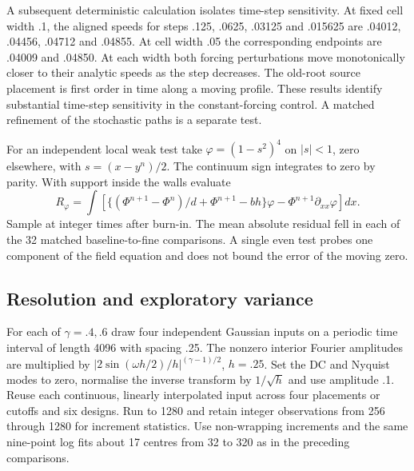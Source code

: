 \documentclass[11pt]{article}
\begin{document}
A subsequent deterministic calculation isolates time-step sensitivity.
At fixed cell width .1, the aligned speeds for steps .125, .0625, .03125
and .015625 are .04012, .04456, .04712 and .04855. At cell width .05 the
corresponding endpoints are .04009 and .04850. At each width both forcing
perturbations move monotonically closer to their analytic speeds as the
step decreases. The old-root source placement is first order in time
along a moving profile. These results identify substantial time-step
sensitivity in the constant-forcing control. A matched refinement of
the stochastic paths is a separate test.

For an independent local weak test take \(\varphi=(1-s^2)^4\) on
\(|s|<1\), zero elsewhere, with \(s=(x-y^n)/2\). The continuum
sign integrates to zero by parity. With support inside the walls evaluate
\[
 R_\varphi=\int\left[\{(\Phi^{n+1}-\Phi^n)/d+\Phi^{n+1}-b h\}\varphi
                      -\Phi^{n+1}\partial_{xx}\varphi\right]dx .
\]
Sample at integer times after burn-in. The mean absolute residual fell in
each of the 32 matched baseline-to-fine comparisons. A single even test
probes one component of the field equation and does not bound the error
of the moving zero.

\subsection{Resolution and exploratory variance}
For each of \(\gamma=.4,.6\) draw four independent Gaussian inputs on a
periodic time interval of length 4096 with spacing .25. The nonzero
interior Fourier amplitudes are multiplied by
\(\lvert2\sin(\omega h/2)/h\rvert^{(\gamma-1)/2}\), \(h=.25\).
Set the DC and Nyquist modes to zero, normalise the inverse transform by
\(1/\sqrt{h}\) and use amplitude .1. Reuse each continuous, linearly
interpolated input across four placements or cutoffs and six designs.
Run to 1280 and retain integer observations from 256 through 1280 for
increment statistics. Use non-wrapping increments and the same nine-point
log fits about 17 centres from 32 to 320 as in the preceding comparisons.
\end{document}
